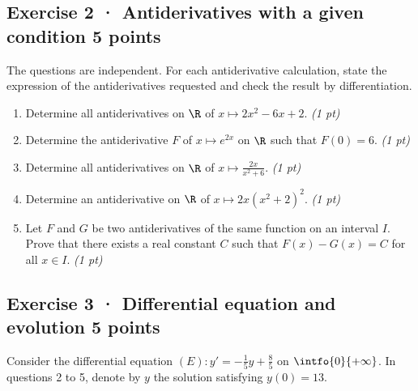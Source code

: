\subsection*{Exercise 2 · Antiderivatives with a given condition \hfill 5 points}The  questions are independent. For each antiderivative calculation, state the expression of the antiderivatives requested and check the result by differentiation.

\begin{enumerate}

\item Determine all antiderivatives on $\R$ of $x\mapsto 2x^2-6x+2$. \hfill\textit{(1 pt)}

\item Determine the antiderivative $F$ of $x\mapsto e^{2x}$ on $\R$ such that $F(0)=6$. \hfill\textit{(1 pt)}

\item Determine all antiderivatives on $\R$ of $x\mapsto\frac{2x}{x^2+6}$. \hfill\textit{(1 pt)}

\item Determine an antiderivative on $\R$ of $x\mapsto2x(x^2+2)^{2}$. \hfill\textit{(1 pt)}

\item Let $F$ and $G$ be two antiderivatives of the same function on an interval $I$. Prove that there exists a real constant $C$ such that $F(x)-G(x)=C$ for all $x\in I$. \hfill\textit{(1 pt)}

\end{enumerate}

\mxnewpage{}

\subsection*{Exercise 3 · Differential equation and evolution \hfill 5 points}Consider the differential equation $(E):y'=-\frac1{5}y+\frac{8}{5}$ on $\intfo{0}{+\infty}$. In questions 2 to 5, denote by $y$ the solution satisfying $y(0)=13$.

